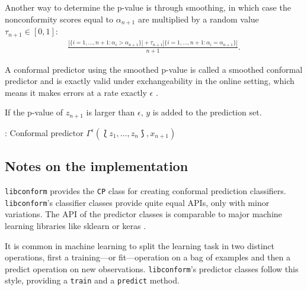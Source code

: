 \documentclass[twoside,11pt]{article}
\def\libconform{\texttt{libconform}}
\begin{document}
Another way to determine the p-value is through smoothing,
in which case the nonconformity scores equal to
$\alpha_{n+1}$ are multiplied by a random value
$\tau_{n+1} \in [0,1]$:
\begin{align}
  \frac{|\{i=1,\dots,n+1: \alpha_i > \alpha_{n+1}\}|
    + \tau_{n+1} |\{i=1,\dots,n+1:\alpha_i=\alpha_{n+1}\}|}
       {n + 1}.
\label{eq:p1}
\end{align}

A conformal predictor using the smoothed p-value is called
a smoothed conformal predictor and is exactly valid under
exchangeability in the online setting, which means it makes
errors at a rate exactly $\epsilon$
\citep[see][Chapter 2]{alrw}.

If the p-value of $z_{n+1}$ is larger than $\epsilon$, $y$
is added to the prediction set.

\begin{algorithm}
  \caption{: Conformal predictor $\Gamma^\epsilon
    (\Lbag z_1,\dots,z_n \Rbag, x_{n+1})$}
  \label{alg:cp}

  \begin{algorithmic}[1]
      \ENDFOR
      \ENDIF
    \ENDFOR
  \end{algorithmic}
\end{algorithm}

\subsection*{Notes on the implementation}

\libconform{} provides the \texttt{CP} class for creating
conformal prediction classifiers. \libconform{}'s
classifier classes provide quite equal APIs, only with
minor variations.
The API of the predictor classes is comparable to major
machine learning libraries like sklearn or keras
\citep[see][]{sklearn_api, keras}.

It is common in machine learning to split the learning task
in two distinct operations, first a
training---or fit---operation on a bag of examples
and then a predict operation on new observations.
\libconform{}'s predictor classes follow this style,
providing a \texttt{train} and a \texttt{predict} method.
\end{document}

